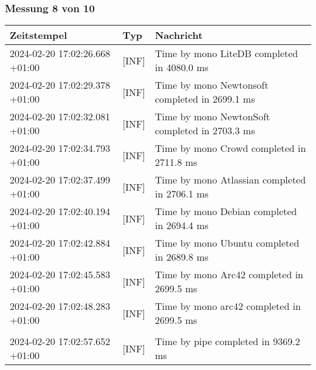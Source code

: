     \subsubsection*{Messung 8 von 10} \label{subsubsec:LiteDbWenigerPaketeAlsDb8von10}
        {
            {\small
                \begin{tabularx}{\textwidth}{|l|l|X|}
                    \hline
                    \textbf{Zeitstempel} & \textbf{Typ} & \textbf{Nachricht} \\
                    \hline
                    \endhead
                    2024-02-20 17:02:26.668 +01:00 & [INF] & Time by mono LiteDB completed in 4080.0 ms \\
                    2024-02-20 17:02:29.378 +01:00 & [INF] & Time by mono Newtonsoft completed in 2699.1 ms \\
                    2024-02-20 17:02:32.081 +01:00 & [INF] & Time by mono NewtonSoft completed in 2703.3 ms \\
                    2024-02-20 17:02:34.793 +01:00 & [INF] & Time by mono Crowd completed in 2711.8 ms \\
                    2024-02-20 17:02:37.499 +01:00 & [INF] & Time by mono Atlassian completed in 2706.1 ms \\
                    2024-02-20 17:02:40.194 +01:00 & [INF] & Time by mono Debian completed in 2694.4 ms \\
                    2024-02-20 17:02:42.884 +01:00 & [INF] & Time by mono Ubuntu completed in 2689.8 ms \\
                    2024-02-20 17:02:45.583 +01:00 & [INF] & Time by mono Arc42 completed in 2699.5 ms \\
                    2024-02-20 17:02:48.283 +01:00 & [INF] & Time by mono arc42 completed in 2699.5 ms \\
                    & & \\
                    2024-02-20 17:02:57.652 +01:00 & [INF] & Time by pipe completed in 9369.2 ms \\
                    \hline
                \end{tabularx}
            }
        }

